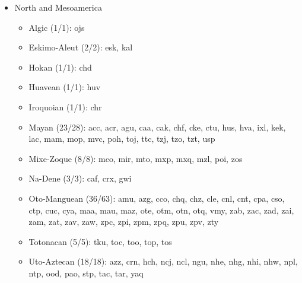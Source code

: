 \begin{itemize}[label={},leftmargin=!,labelindent=5pt,itemindent=-15pt]
  \item North and Mesoamerica
    \begin{itemize}[label={},leftmargin=!,labelindent=5pt,itemindent=-15pt]
  	\item Algic (1/1): ojs
  	\item Eskimo-Aleut (2/2): esk, kal
  	\item Hokan (1/1): chd
  	\item Huavean (1/1): huv
  	\item Iroquoian (1/1): chr
  	\item Mayan (23/28): acc, acr, agu, caa, cak, chf, cke, ctu, hus, hva, ixl, kek, lac, mam, mop, mvc, poh, toj, ttc, tzj, tzo, tzt, usp
  	\item Mixe-Zoque (8/8): mco, mir, mto, mxp, mxq, mzl, poi, zos
  	\item Na-Dene (3/3): caf, crx, gwi
  	\item Oto-Manguean (36/63): amu, azg, cco, chq, chz, cle, cnl, cnt, cpa, cso, ctp, cuc, cya, maa, mau, maz, ote, otm, otn, otq, vmy, zab, zac, zad, zai, zam, zat, zav, zaw, zpc, zpi, zpm, zpq, zpu, zpv, zty
  	\item Totonacan (5/5): tku, toc, too, top, tos
  	\item Uto-Aztecan (18/18): azz, crn, hch, ncj, ncl, ngu, nhe, nhg, nhi, nhw, npl, ntp, ood, pao, stp, tac, tar, yaq
    \end{itemize}


\end{itemize}
